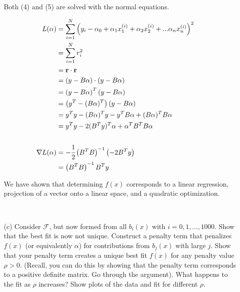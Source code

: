 \documentclass[]{article}
\begin{document}
~

\begin{itemize} \item[ ] 
Both (4) and (5) are solved with the normal equations. 
\end{itemize}

\begin{align*}
L(\alpha) &= \sum_{i=1}^N \left(   y_i - \alpha_0 + \alpha_1x_1^{(i)} + \alpha_2x_2^{(i)} + ... \alpha_nx_n^{(i)}  \right)^2 \\
&= \sum_{i=1}^N r_i^2 \\
&= {\bf r}\cdot{\bf r} \\
&=\left(y-B \alpha \right) \cdot \left(y-B \alpha\right) \\
&=\left(y-B \alpha\right)^T \left(y-B \alpha\right) \\
&= \left(y^T- (B \alpha)^T \right) \left(y-B \alpha\right) \\
&=y^Ty - (B\alpha)^Ty-y^TB\alpha + (B \alpha)^T B \alpha \\
&= y^Ty - 2(B^T y )^T  \alpha +\alpha^T B^T B \alpha \\
\\
\nabla L(\alpha) &= -\cfrac{1}{2} \left(B^T B \right)^{-1} \left(-2B^T y \right) \\
&= \left( B^T B \right)^{-1} B^T y
\end{align*}

\begin{itemize} \item[ ] 
We have shown that determining $f(x)$ corresponds to a linear regression, projection of a vector onto a linear space, and a quadratic optimization.
\end{itemize}

~

\begin{itemize}
\item[(c)] Consider $\mathcal{F}$, but now formed from all $b_i(x)$ with $i=0,1,\dots,1000$.  Show that the best fit is now not unique.  Construct a penalty term that penalizes $f(x)$ (or equivalently $\alpha$) for contributions from $b_j(x)$ with large $j$.  Show that your penalty term creates a unique best fit $f(x)$ for any penalty value $\rho > 0$.  (Recall, you can do this by showing that the penalty term corresponds to a positive definite matrix.  Go through the argument).  What happens to the fit as $\rho$ increases?   Show plots of the data and fit for different $\rho$.  
\end{itemize}
\end{document}
